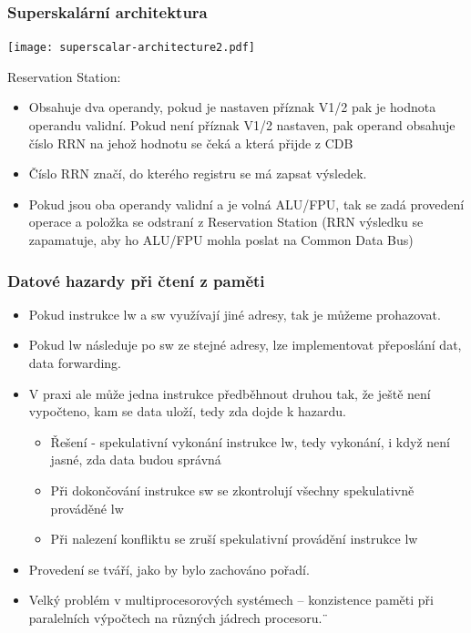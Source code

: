 \documentclass{beamer}
\begin{document}
\begin{frame}
\frametitle{Superskalární architektura}

\begin{center}
\texttt{[image: superscalar-architecture2.pdf]}
\end{center}

\scriptsize
Reservation Station:
\begin{itemize}
\item Obsahuje dva operandy, pokud je nastaven příznak V1/2 pak je hodnota operandu validní. Pokud není příznak V1/2 nastaven, pak operand obsahuje číslo RRN na jehož hodnotu se čeká a která přijde z CDB
\item Číslo RRN značí, do kterého registru se má zapsat výsledek.
\item Pokud jsou oba operandy validní a je volná ALU/FPU, tak se zadá provedení operace a položka se odstraní z Reservation Station (RRN výsledku se zapamatuje, aby ho ALU/FPU mohla poslat na Common Data Bus)
\end{itemize}

\end{frame}

\begin{frame}
\frametitle{Datové hazardy při čtení z paměti}

\begin{itemize}
\item Pokud instrukce lw a sw využívají jiné adresy, tak je můžeme prohazovat.
\item Pokud lw následuje po sw ze stejné adresy, lze implementovat přeposlání dat, data forwarding.
\item V praxi ale může jedna instrukce předběhnout druhou tak, že ještě není vypočteno, kam se data uloží, tedy zda dojde k hazardu.
\begin{itemize}
\item Řešení - spekulativní vykonání instrukce lw, tedy vykonání, i když není jasné, zda data budou správná
\item Při dokončování instrukce sw se zkontrolují všechny spekulativně prováděné lw 
\item Při nalezení konfliktu se zruší spekulativní provádění instrukce lw
\end{itemize}
\item Provedení se tváří, jako by bylo zachováno pořadí.
\item Velký problém v multiprocesorových systémech -- konzistence paměti při paralelních výpočtech na různých jádrech procesoru.¨
\end{itemize}

\end{frame}
\end{document}
